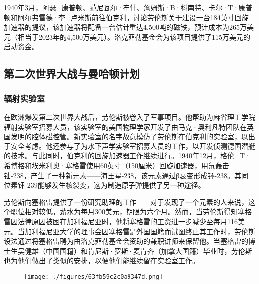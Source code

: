 1940年3月，阿瑟·康普顿、范尼瓦尔·布什、詹姆斯·B·科南特、卡尔·T·康普顿和阿尔弗雷德·李·卢米斯前往伯克利，讨论劳伦斯关于建设一台184英寸回旋加速器的提议，该加速器将配备一台估计重达4,500吨的磁铁，预计成本为265万美元（相当于2023年的4,500万美元）。洛克菲勒基金会为该项目提供了115万美元的启动资金。
\subsection{第二次世界大战与曼哈顿计划}
\subsubsection{辐射实验室}
在欧洲爆发第二次世界大战后，劳伦斯被卷入了军事项目。他帮助为麻省理工学院辐射实验室招募人员，该实验室的美国物理学家开发了由马克·奥利凡特团队在英国发明的腔体磁控管。新实验室的名字故意模仿了劳伦斯在伯克利的实验室，以出于安全考虑。他还参与了为水下声学实验室招募人员的工作，以开发侦测德国潜艇的技术。与此同时，伯克利的回旋加速器工作继续进行。1940年12月，格伦·T·希博格和埃米利奥·塞格雷使用60英寸（150厘米）回旋加速器，用氘轰击铀-238，产生了一种新元素——海王星-238，该元素通过β衰变形成钚-238。其同位素钚-239能够发生核裂变，这为制造原子弹提供了另一种途径。

劳伦斯向塞格雷提供了一份研究助理的工作——对于发现了一个元素的人来说，这个职位相对较低，薪水为每月300美元，期限为六个月。然而，当劳伦斯得知塞格雷因法律原因被困在加利福尼亚时，他将塞格雷的工资进一步减少至每月116美元。当加利福尼亚大学的理事会因塞格雷是外国国籍而试图终止其工作时，劳伦斯设法通过将塞格雷聘为由洛克菲勒基金会资助的兼职讲师来保留他。当塞格雷的博士生吴健雄（中国国籍）和肯尼斯·罗斯·麦肯齐（加拿大国籍）毕业时，劳伦斯也为他们做出了类似的安排，以便他们能继续留在实验室工作。
\begin{figure}[ht]
\centering
\texttt{[image: ./figures/63fb59c2c0a9347d.png]}
\caption{} \label{fig_ONST_5}
\end{figure}